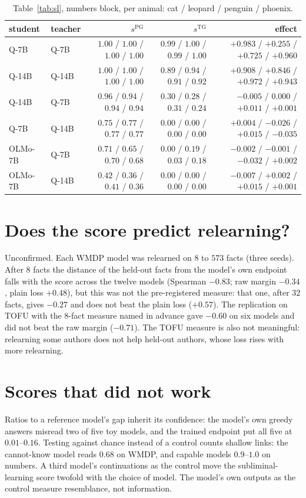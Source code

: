 \documentclass{article}
\theoremstyle{definition}
\newcommand{\sPG}{s^{\mathrm{PG}}}
\newcommand{\sTG}{s^{\mathrm{TG}}}
\begin{document}
\begin{table}[h]
\centering
\small
\begin{tabular}{llrrr}
\toprule
student & teacher & $\sPG$ & $\sTG$ & effect \\
\midrule
Q-7B & Q-7B & $1.00$ / $1.00$ / $1.00$ / $1.00$ & $0.99$ / $1.00$ / $0.99$ / $1.00$ & $+0.983$ / $+0.255$ / $+0.725$ / $+0.960$ \\
Q-14B & Q-14B & $1.00$ / $1.00$ / $1.00$ / $1.00$ & $0.89$ / $0.94$ / $0.91$ / $0.92$ & $+0.908$ / $+0.846$ / $+0.972$ / $+0.943$ \\
Q-14B & Q-7B & $0.96$ / $0.94$ / $0.94$ / $0.94$ & $0.30$ / $0.28$ / $0.31$ / $0.24$ & $-0.005$ / $0.000$ / $+0.011$ / $+0.001$ \\
Q-7B & Q-14B & $0.75$ / $0.77$ / $0.77$ / $0.77$ & $0.00$ / $0.00$ / $0.00$ / $0.00$ & $+0.004$ / $-0.026$ / $+0.015$ / $-0.035$ \\
OLMo-7B & Q-7B & $0.71$ / $0.65$ / $0.70$ / $0.68$ & $0.00$ / $0.19$ / $0.03$ / $0.18$ & $-0.002$ / $-0.001$ / $-0.032$ / $+0.002$ \\
OLMo-7B & Q-14B & $0.42$ / $0.36$ / $0.41$ / $0.36$ & $0.00$ / $0.00$ / $0.00$ / $0.00$ & $-0.007$ / $+0.002$ / $+0.015$ / $+0.001$ \\
\bottomrule
\end{tabular}
\caption{Table~\ref{tab:sl}, numbers block, per animal: cat / leopard / penguin / phoenix.}
\label{tab:slfull}
\end{table}

\section{Does the score predict relearning?}

Unconfirmed. Each WMDP model was relearned on $8$ to $573$ facts (three seeds). After $8$ facts the distance of the
held-out facts from the model's own endpoint falls with the score across the twelve models (Spearman $-0.83$;
raw margin $-0.34$, plain loss $+0.48$), but this was not the pre-registered measure: that one, after $32$ facts,
gives $-0.27$ and does not beat the plain loss ($+0.57$). The replication on TOFU with the $8$-fact measure named in
advance gave $-0.60$ on six models and did not beat the raw margin ($-0.71$). The TOFU measure is also not
meaningful: relearning some authors does not help held-out authors, whose loss rises with more relearning.

\section{Scores that did not work}

Ratios to a reference model's gap inherit its confidence: the model's own greedy answers misread two of five toy
models, and the trained endpoint put all five at $0.01$--$0.16$. Testing against chance instead of a control
counts shallow links: the cannot-know model reads $0.68$ on WMDP, and capable models $0.9$--$1.0$ on numbers. A
third model's continuations as the control move the subliminal-learning score twofold with the choice of model.
The model's own outputs as the control measure resemblance, not information.
\end{document}
